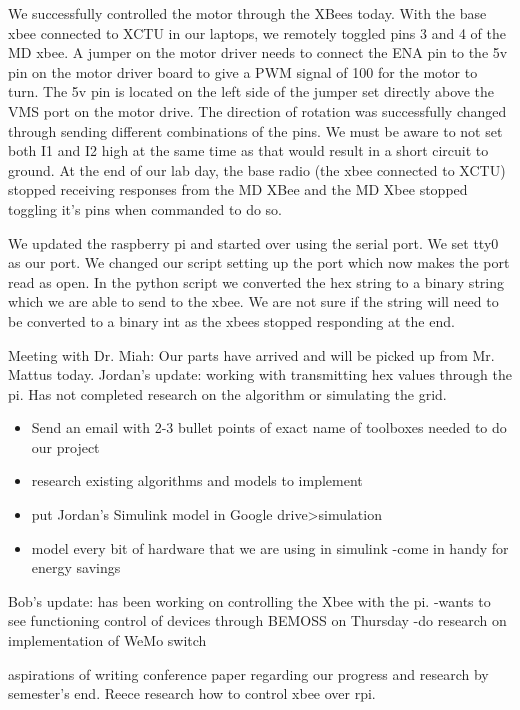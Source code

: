 \documentclass[fontsize=11pt, %
                             paper=letter, %
                             twoside, %
                             captions=tableheading,
                             index=totoc,
                             hyperref]{labbook}
\begin{document}
We successfully controlled the motor through the XBees today. With the base xbee connected to XCTU in our laptops, we remotely toggled pins 3 and 4 of the MD xbee. A jumper on the motor driver needs to connect the ENA pin to the 5v pin on the motor driver board to give a PWM signal of 100 for the motor to turn. The 5v pin is located on the left side of the jumper set directly above the VMS port on the motor drive. The direction of rotation was successfully changed through sending different combinations of the pins. We must be aware to not set both I1 and I2 high at the same time as that would result in a short circuit to ground. At the end of our lab day, the base radio (the xbee connected to XCTU) stopped receiving responses from the MD XBee and the MD Xbee stopped toggling it's pins when commanded to do so.

We updated the raspberry pi and started over using the serial port. We set tty0 as our port. We changed our script setting up the port which now makes the port read as open. In the python script we converted the hex string to a binary string which we are able to send to the xbee. We are not sure if the string will need to be converted to a binary int as the xbees stopped responding at the end.


Meeting with Dr. Miah: 
Our parts have arrived and will be picked up from Mr. Mattus today. 
Jordan's update: working with transmitting hex values through the pi. Has not completed research on the algorithm or simulating the grid. 
\begin{itemize}
\item Send an email with 2-3 bullet points of exact name of toolboxes needed to do our project
\item research existing algorithms and models to implement 
\item put Jordan's Simulink model in Google drive>simulation
\item model every bit of hardware that we are using in simulink 
    -come in handy for energy savings 
\end{itemize}

Bob's update: has been working on controlling the Xbee with the pi. 
-wants to see functioning control of devices through BEMOSS on Thursday 
-do research on implementation of WeMo switch 

aspirations of writing conference paper regarding our progress and research by semester's end. 
Reece research how to control xbee over rpi. 
\end{document}
